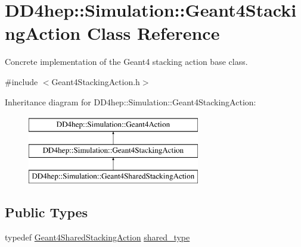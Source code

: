 \hypertarget{class_d_d4hep_1_1_simulation_1_1_geant4_stacking_action}{}\section{D\+D4hep\+:\+:Simulation\+:\+:Geant4\+Stacking\+Action Class Reference}
\label{class_d_d4hep_1_1_simulation_1_1_geant4_stacking_action}


Concrete implementation of the Geant4 stacking action base class.  




{\ttfamily \#include $<$Geant4\+Stacking\+Action.\+h$>$}

Inheritance diagram for D\+D4hep\+:\+:Simulation\+:\+:Geant4\+Stacking\+Action\+:\begin{figure}[H]
\begin{center}
\leavevmode
\includegraphics[height=3.000000cm]{class_d_d4hep_1_1_simulation_1_1_geant4_stacking_action}
\end{center}
\end{figure}
\subsection*{Public Types}
\begin{DoxyCompactItemize}
\item 
typedef \hyperlink{class_d_d4hep_1_1_simulation_1_1_geant4_shared_stacking_action}{Geant4\+Shared\+Stacking\+Action} \hyperlink{class_d_d4hep_1_1_simulation_1_1_geant4_stacking_action_a7cb1de3eaba3df79df86318e664968e4}{shared\+\_\+type}
\end{DoxyCompactItemize}
